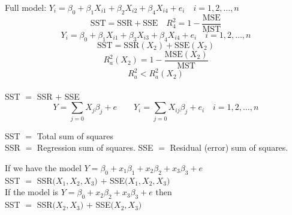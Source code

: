 \documentclass[11pt,a4paper]{article}
\theoremstyle{definition}
\begin{document}
Full model: $Y_i=\beta_0+\beta_1X_{i1}+\beta_2X_{i2}+\beta_4X_{i4}+e_i\quad  i=1,2,\ldots ,n$
$$\text{SST} = \text{SSR} + \text{SSE}\quad  R^2_4=1-\frac{\text{MSE}}{\text{MST}}$$
$$Y_i=\beta_0+\beta_1X_{i1}+\beta_3X_{i3}+\beta_4X_{i4}+e_i\quad  i=1,2,\ldots ,n$$
$$\text{SST} = \text{SSR}(X_2) +\text{SSE}(X_2)$$
$$R^2_a(X_2)=1-\frac{\text{MSE}(X_2)}{\text{MST}}$$
$$R^2_a<R^2_a(X_2)$$\\


SST $=$ SSR $+$ SSE
$$Y=\sum_{j=0}X_j\beta_j+e\qquad  Y_i=\sum_{j=0}X_{ij}\beta_j+e_i\quad  i=1,2,\ldots ,n$$

SST $=$ Total sum of squares\\
SSR $=$ Regression sum of  squares.
SSE $=$ Residual (error) sum of squares.

If we have the model $Y=\beta_0+x_1\beta_1+x_2\beta_2+x_3\beta_3+e$\\
SST $=$ SSR$\big(X_1,X_2,X_3\big)$ $+$ SSE$\big(X_1,X_2,X_3\big)$\\


If the model is $Y=\beta_0+x_2\beta_2+x_3\beta_3+e$ then \\
SST $=$ SSR$\big(X_2,X_3\big)$ + SSE$\big(X_2,X_3\big)$\\
\end{document}
